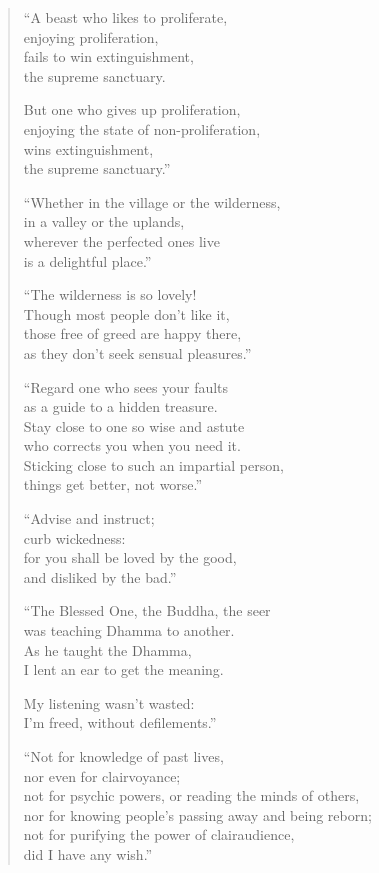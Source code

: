 \documentclass[12pt,openany]{book}%
\begin{document}
\begin{verse}
“A beast who likes to proliferate, \\
enjoying proliferation, \\
fails to win extinguishment, \\
the supreme sanctuary. 

But one who gives up proliferation, \\
enjoying the state of non-proliferation, \\
wins extinguishment, \\
the supreme sanctuary.” 

“Whether in the village or the wilderness, \\
in a valley or the uplands, \\
wherever the perfected ones live \\
is a delightful place.” 

“The wilderness is so lovely! \\
Though most people don’t like it, \\
those free of greed are happy there, \\
as they don’t seek sensual pleasures.” 

“Regard one who sees your faults \\
as a guide to a hidden treasure. \\
Stay close to one so wise and astute \\
who corrects you when you need it. \\
Sticking close to such an impartial person, \\
things get better, not worse.” 

“Advise and instruct; \\
curb wickedness: \\
for you shall be loved by the good, \\
and disliked by the bad.” 

“The Blessed One, the Buddha, the seer \\
was teaching Dhamma to another. \\
As he taught the Dhamma, \\
I lent an ear to get the meaning. 

My listening wasn’t wasted: \\
I’m freed, without defilements.” 

“Not for knowledge of past lives, \\
nor even for clairvoyance; \\
not for psychic powers, or reading the minds of others, \\
nor for knowing people’s passing away and being reborn; \\
not for purifying the power of clairaudience, \\
did I have any wish.” 


\end{verse}
\end{document}
